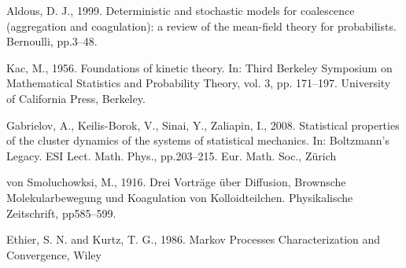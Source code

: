\documentclass[11pt, notitlepage]{article}
\begin{document}
\begin{thebibliography}{}
 Aldous, D. J., 1999. Deterministic and stochastic models for coalescence (aggregation and coagulation): a review of the mean-field theory for probabilists. Bernoulli, pp.3--48.  

 Kac, M., 1956. Foundations of kinetic theory. In: Third Berkeley Symposium on Mathematical Statistics and Probability Theory, vol. 3, pp. 171--197. University of California Press, Berkeley. 

 Gabrielov, A., Keilis-Borok, V., Sinai, Y., Zaliapin, I., 2008. Statistical properties of the cluster dynamics of the systems of statistical mechanics. In: Boltzmann’s Legacy. ESI Lect. Math. Phys., pp.203--215. Eur.
Math. Soc., Zürich

 von Smoluchowksi, M., 1916. Drei Vorträge über Diffusion, Brownsche Molekularbewegung und Koagulation von Kolloidteilchen. Physikalische Zeitschrift, pp585--599.

 Ethier, S. N. and Kurtz, T. G., 1986. Markov Processes Characterization and Convergence, Wiley

\end{thebibliography}
\end{document}
